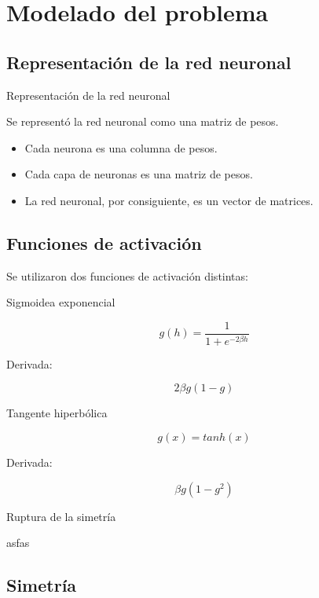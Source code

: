 \documentclass{beamer}
\begin{document}
\section{Modelado del problema}
\subsection{Representación de la red neuronal}

\begin{frame}{Representación de la red neuronal}
\par Se representó la red neuronal como una matriz de pesos. \\
\begin{itemize}
\item Cada neurona es una columna de pesos.
\item Cada capa de neuronas es una matriz de pesos.
\item La red neuronal, por consiguiente, es un vector de matrices.
\end{itemize}
\end{frame}

\subsection{Funciones de activación}
\begin{frame}
 Se utilizaron dos funciones de activación distintas:
\begin{block}{Sigmoidea exponencial}

\[
  g(h) = \frac{1}{1 + e^{-2 \beta h}} 
\]

Derivada:

\[
  2 \beta g(1-g) 
\]

\end{block}

\begin{block}{Tangente hiperbólica}

\[
  g(x) = tanh(x) 
\]

Derivada:

\[
  \beta g(1-g^2) 
\]

\end{block}

\end{frame}

\begin{frame}{Ruptura de la simetría}
\par asfas
\end{frame}


\subsection{Simetría}
\end{document}
